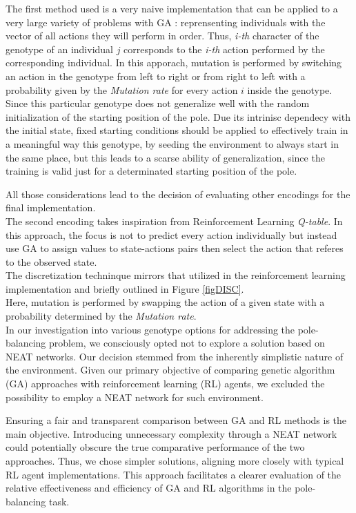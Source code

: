 The first method used is a very naive implementation that can be applied to a very large variety of problems with GA : reprensenting individuals with the vector of all actions they will perform in order.
Thus, \textit{i-th} character of the genotype of an individual $j$ corresponds to the \textit{i-th} action performed by the corresponding individual.
In this apporach, mutation is performed by switching an action in the genotype from left to right or from right to left with a probability given by the \textit{Mutation rate} for every action $i$ inside the genotype.
\\
Since this particular genotype does not generalize well with the random initialization of the starting position of the pole. Due its intrinisc dependecy with the initial state, fixed starting conditions should be applied to effectively train in a meaningful way this genotype, by seeding the environment to always start in the same place, but this leads to a scarse ability of generalization, since the training is valid just for a determinated starting position of the pole.

All those considerations lead to the decision of evaluating other encodings for the final implementation.\\

The second encoding takes inspiration from Reinforcement Learning \textit{Q-table}.
In this approach, the focus is not to predict every action individually  but instead use GA to assign values to state-actions pairs then select the action that referes to the observed state.\\
The discretization techninque mirrors that utilized in the reinforcement learning implementation and briefly outlined in Figure \ref{figDISC}.\\
Here, mutation is performed by swapping the action of a given state with a probability determined by the \textit{Mutation rate}.
\\
In our investigation into various genotype options for addressing the pole-balancing problem, we consciously opted not to explore a solution based on NEAT\cite{6790655} networks. Our decision stemmed from the inherently simplistic nature of the environment. Given our primary objective of comparing genetic algorithm (GA) approaches with reinforcement learning (RL) agents, we excluded the possibility to employ a NEAT network for such environment.

Ensuring a fair and transparent comparison between GA and RL methods is the main objective. Introducing unnecessary complexity through a NEAT network could potentially obscure the true comparative performance of the two approaches. Thus, we chose simpler solutions, aligning more closely with typical RL agent implementations. This approach facilitates a clearer evaluation of the relative effectiveness and efficiency of GA and RL algorithms in the pole-balancing task.


